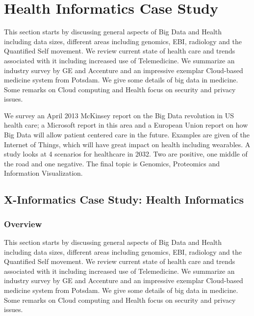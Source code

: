 

\section{Health Informatics Case
Study}\label{health-informatics-case-study}

\FILENAME

This section starts by discussing general aspects of Big Data and Health
including data sizes, different areas including genomics, EBI, radiology
and the Quantified Self movement. We review current state of health care
and trends associated with it including increased use of Telemedicine.
We summarize an industry survey by GE and Accenture and an impressive
exemplar Cloud-based medicine system from Potsdam. We give some details
of big data in medicine. Some remarks on Cloud computing and Health
focus on security and privacy issues.

We survey an April 2013 McKinsey report on the Big Data revolution in US
health care; a Microsoft report in this area and a European Union report
on how Big Data will allow patient centered care in the future. Examples
are given of the Internet of Things, which will have great impact on
health including wearables. A study looks at 4 scenarios for healthcare
in 2032. Two are positive, one middle of the road and one negative. The
final topic is Genomics, Proteomics and Information Visualization.

\subsection{X-Informatics Case Study: Health
Informatics}\label{x-informatics-case-study-health-informatics}

\subsubsection{Overview}\label{overview}


This section starts by discussing general aspects of Big Data and Health
including data sizes, different areas including genomics, EBI, radiology
and the Quantified Self movement. We review current state of health care
and trends associated with it including increased use of Telemedicine.
We summarize an industry survey by GE and Accenture and an impressive
exemplar Cloud-based medicine system from Potsdam. We give some details
of big data in medicine. Some remarks on Cloud computing and Health
focus on security and privacy issues.

